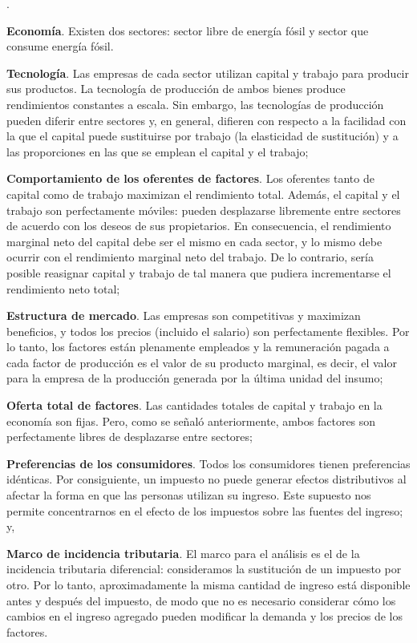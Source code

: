 \documentclass[10pt,a4paper]{article}
\newcounter{numitem}
\newenvironment{lnum}
      {\begin{list}{\arabic{numitem}.}{%
          \usecounter{numitem}%
          \setlength{\leftmargin}{1cm}%
          \setlength{\parskip}{3pt}%
          \setlength{\itemsep}{0pt}%
          \setlength{\parsep}{0pt}%
      }}
      {\end{list}}
\begin{document}
\begin{lnum}
    \item \textbf{Economía}. Existen dos sectores: sector libre de energía fósil y sector que consume energía fósil.
    \item \textbf{Tecnología}. Las empresas de cada sector utilizan capital y trabajo para producir sus productos. La tecnología de producción de ambos bienes produce rendimientos constantes a escala. Sin embargo, las tecnologías de producción pueden diferir entre sectores y, en general, difieren con respecto a la facilidad con la que el capital puede sustituirse por trabajo (la elasticidad de sustitución) y a las proporciones en las que se emplean el capital y el trabajo;
    \item \textbf{Comportamiento de los oferentes de factores}. Los oferentes tanto de capital como de trabajo maximizan el rendimiento total. Además, el capital y el trabajo son perfectamente móviles: pueden desplazarse libremente entre sectores de acuerdo con los deseos de sus propietarios. En consecuencia, el rendimiento marginal neto del capital debe ser el mismo en cada sector, y lo mismo debe ocurrir con el rendimiento marginal neto del trabajo. De lo contrario, sería posible reasignar capital y trabajo de tal manera que pudiera incrementarse el rendimiento neto total;
    \item \textbf{Estructura de mercado}. Las empresas son competitivas y maximizan beneficios, y todos los precios (incluido el salario) son perfectamente flexibles. Por lo tanto, los factores están plenamente empleados y la remuneración pagada a cada factor de producción es el valor de su producto marginal, es decir, el valor para la empresa de la producción generada por la última unidad del insumo;
    \item \textbf{Oferta total de factores}. Las cantidades totales de capital y trabajo en la economía son fijas. Pero, como se señaló anteriormente, ambos factores son perfectamente libres de desplazarse entre sectores;
    \item \textbf{Preferencias de los consumidores}. Todos los consumidores tienen preferencias idénticas. Por consiguiente, un impuesto no puede generar efectos distributivos al afectar la forma en que las personas utilizan su ingreso. Este supuesto nos permite concentrarnos en el efecto de los impuestos sobre las fuentes del ingreso; y,
    \item \textbf{Marco de incidencia tributaria}. El marco para el análisis es el de la incidencia tributaria diferencial: consideramos la sustitución de un impuesto por otro. Por lo tanto, aproximadamente la misma cantidad de ingreso está disponible antes y después del impuesto, de modo que no es necesario considerar cómo los cambios en el ingreso agregado pueden modificar la demanda y los precios de los factores.
\end{lnum}
\end{document}
